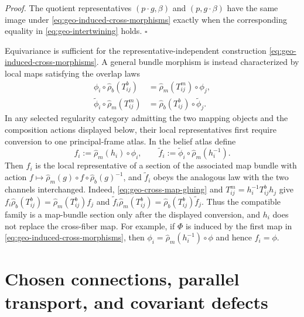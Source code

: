 \noindent\emph{Proof.}
The quotient representatives $(p\cdot g,\beta)$ and $(p,g\cdot\beta)$ have the same image under
\eqref{eq:geo-induced-cross-morphisms} exactly when the corresponding equality in
\eqref{eq:geo-intertwining} holds. \hfill$\square$

Equivariance is sufficient for the representative-independent construction
\eqref{eq:geo-induced-cross-morphisms}.  A general bundle morphism is instead characterized by
local maps satisfying the overlap laws
\begin{equation}
\begin{aligned}
\phi_i\circ\widehat\rho_b(T_{ij}^b)
&=\widehat\rho_m(T_{ij}^m)\circ\phi_j,\\
\widetilde\phi_i\circ\widehat\rho_m(T_{ij}^m)
&=\widehat\rho_b(T_{ij}^b)\circ\widetilde\phi_j.
\end{aligned}
\label{eq:geo-cross-map-gluing}
\end{equation}
In any selected regularity category admitting the two mapping objects and the composition actions
displayed below, their local representatives first require conversion to one principal-frame
atlas.  In the belief atlas define
\begin{equation}
f_i:=\widehat\rho_m(h_i)\circ\phi_i,
\qquad
\widetilde f_i:=\widetilde\phi_i\circ\widehat\rho_m(h_i^{-1}).
\label{eq:geo-map-bundle-frame-conversion}
\end{equation}
Then $f_i$ is the local representative of a section of the associated map bundle with action
$f\mapsto\widehat\rho_m(g)\circ f\circ\widehat\rho_b(g)^{-1}$, and
$\widetilde f_i$ obeys the analogous law with the two channels interchanged.  Indeed,
\eqref{eq:geo-cross-map-gluing} and
$T_{ij}^m=h_i^{-1}T_{ij}^b h_j$ give
$f_i\widehat\rho_b(T_{ij}^b)=\widehat\rho_m(T_{ij}^b)f_j$ and
$\widetilde f_i\widehat\rho_m(T_{ij}^b)=\widehat\rho_b(T_{ij}^b)\widetilde f_j$.
Thus the compatible family is a map-bundle section only after the displayed conversion, and
$h_i$ does not replace the cross-fiber map.  For example, if $\Phi$ is induced by the first map in
\eqref{eq:geo-induced-cross-morphisms}, then
$\phi_i=\widehat\rho_m(h_i^{-1})\circ\phi$ and hence $f_i=\phi$.

\section{Chosen connections, parallel transport, and covariant defects}
\label{sec:geo-three-transports}

